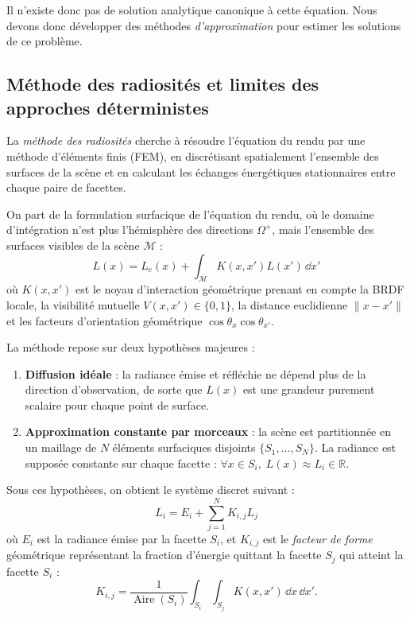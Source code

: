 Il n'existe donc pas de solution analytique canonique à cette équation. Nous devons donc développer des méthodes \emph{d'approximation} pour estimer les solutions de ce problème. 

\subsection{Méthode des radiosités et limites des approches déterministes}

La \emph{méthode des radiosités} cherche à résoudre l'équation du rendu par une méthode d'éléments finis (FEM), en discrétisant spatialement l'ensemble des surfaces de la scène et en calculant les échanges énergétiques stationnaires entre chaque paire de facettes.

On part de la formulation surfacique de l'équation du rendu, où le domaine d'intégration n'est plus l'hémisphère des directions $\Omega^+$, mais l'ensemble des surfaces visibles de la scène $\mathcal{M}$ :
\begin{equation}
    L(x) = L_e(x) + \int_{\mathcal{M}} K(x, x') L(x') \, \dd x'
\end{equation}
où $K(x, x')$ est le noyau d'interaction géométrique prenant en compte la BRDF locale, la visibilité mutuelle $V(x, x') \in \{0, 1\}$, la distance euclidienne $\|x - x'\|$ et les facteurs d'orientation géométrique $\cos\theta_x \cos\theta_{x'}$.

\begin{proposition}
    La méthode repose sur deux hypothèses majeures :
    \begin{enumerate}
        \item \textbf{Diffusion idéale} : la radiance émise et réfléchie ne dépend plus de la direction d'observation, de sorte que $L(x)$ est une grandeur purement scalaire pour chaque point de surface.
        \item \textbf{Approximation constante par morceaux} : la scène est partitionnée en un maillage de $N$ éléments surfaciques disjoints $\{S_1, \dots, S_N\}$. La radiance est supposée constante sur chaque facette : $\forall x \in S_i, \; L(x) \approx L_i \in \mathbb{R}$.
    \end{enumerate}

    Sous ces hypothèses, on obtient le système discret suivant :
    \begin{equation}
        \boxed{L_i = E_i + \sum_{j=1}^N K_{i,j} L_j}
    \end{equation}
    où $E_i$ est la radiance émise par la facette $S_i$, et $K_{i,j}$ est le \emph{facteur de forme} géométrique représentant la fraction d'énergie quittant la facette $S_j$ qui atteint la facette $S_i$ :
    \begin{equation}
        K_{i,j} = \frac{1}{\operatorname{Aire}(S_i)} \int_{S_i} \int_{S_j} K(x, x') \, \dd x \, \dd x'.
    \end{equation}
\end{proposition}


